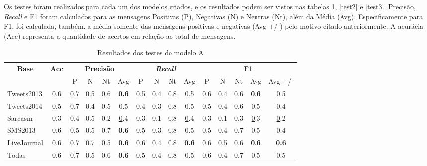 \documentclass[12pt]{article}
\begin{document}
Os testes foram realizados para cada um dos modelos criados, e os resultados podem ser vistos nas tabelas \ref{test1}, \ref{test2} e \ref{test3}. Precisão, \emph{Recall} e F1 foram calculados para as mensagens Positivas (P), Negativas (N) e Neutras (Nt), além da Média (Avg). Especificamente para F1, foi calculada, também, a média somente das mensagens positivas e negativas (Avg +/-) pelo motivo citado anteriormente. A acurácia (Acc) representa a quantidade de acertos em relação ao total de mensagens.

\begin{table}[H]
\centering
\begin{adjustwidth}{-1cm}{}
\begin{tabular}{lcccccccccccccc}
\multicolumn{1}{c}{\textbf{Base}} & \textbf{Acc} & \multicolumn{4}{c}{\textbf{Precisão}} & \multicolumn{4}{c}{\textit{\textbf{Recall}}} & \multicolumn{5}{c}{\textbf{F1}} \\
 &  & \multicolumn{1}{c|}{P} & \multicolumn{1}{c|}{N} & \multicolumn{1}{c|}{Nt} & Avg & \multicolumn{1}{c|}{P} & \multicolumn{1}{c|}{N} & \multicolumn{1}{c|}{Nt} & Avg & \multicolumn{1}{c|}{P} & \multicolumn{1}{c|}{N} & \multicolumn{1}{c|}{Nt} & \multicolumn{1}{c|}{Avg} & Avg +/- \\
Tweets2013 & 0.6 & 0.7 & 0.5 & 0.6 & \textbf{0.6} & 0.5 & 0.4 & 0.8 & 0.5 & 0.6 & 0.4 & 0.6 &  \textbf{0.6} & 0.5 \\ \hline
Tweets2014 & 0.5 & 0.7 & 0.4 & 0.5 & 0.5 & 0.4 & 0.3 & 0.8 & 0.5 & 0.5 & 0.4 & 0.6 & 0.5 & 0.4 \\ \hline
Sarcasm & 0.3 & 0.4 & 0.5 & 0.2 & {\ul0.4} & 0.3 & 0.1 & 0.8 & {\ul0.4} & 0.3 & 0.1 & 0.3 & {\ul0.3} & {\ul0.2} \\ \hline
SMS2013 & 0.6 & 0.5 & 0.5 & 0.7 & \textbf{0.6} & 0.5 & 0.3 & 0.8 & 0.5 & 0.5 & 0.4 & 0.7 & 0.5 & 0.4 \\ \hline
LiveJournal & 0.6 & 0.7 & 0.7 & 0.5 & \textbf{0.6} & 0.6 & 0.4 & 0.8 & \textbf{0.6} & 0.6 & 0.5 & 0.6 & \textbf{0.6} & \textbf{0.6} \\ \hline
Todas & 0.6 & 0.7 & 0.5 & 0.6 & \textbf{0.6} & 0.5 & 0.4 & 0.8 & 0.5 & 0.6 & 0.4 & 0.7 & 0.5 & 0.5 \\ \hline
\end{tabular}
\caption{Resultados dos testes do modelo A}
\label{test1}
\end{adjustwidth}
\end{table}
\end{document}

